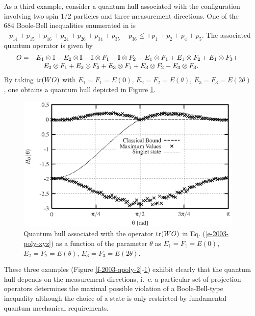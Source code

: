As a third example, consider a quantum hull associated with the
configuration involving two spin 1/2 particles and
three measurement directions. One of the 684 Boole-Bell inequalities enumerated in
\cite{2000-poly} is
$  - p_{14} + p_{15} + p_{16} +
  p_{24} + p_{26} + p_{34} + p_{35} - p_{36} \leq +p_{1}+ p_{2} + p_{4} + p_{5}$.
The associated quantum operator is given by
\begin{equation}
\begin{array}{l}
  O=- {E}_1 \otimes {\Bbb I} - {E}_2 \otimes {\Bbb I} - {\Bbb I} \otimes {F}_1 - {\Bbb I} \otimes
  {F}_2 -
  {E}_1 \otimes {F}_1 + {E}_1 \otimes {F}_2 + {E}_1 \otimes {F}_3 +\\
\qquad \qquad {E}_2
  \otimes {F}_1 + {E}_2 \otimes {F}_3 +
  {E}_3 \otimes {F}_1 + {E}_3 \otimes {F}_2 - {E}_3 \otimes {F}_3.
\end{array}
  \label{e-2003-poly-xyz}
\end{equation}
By taking ${\rm tr}(WO)$ with
${E}_1={F}_1=E(0)$,
${E}_2={F}_2=E(\theta)$,
${E}_3={F}_3=E(2\theta)$, one obtains a quantum hull depicted in Figure  \ref{f-2003-plotpit}.
\begin{figure}
  \centering
  \includegraphics{2003-qpoly-plotpit}
  \caption{Quantum hull associated with the operator
${\rm tr}(WO)$ in Eq. (\ref{e-2003-poly-xyz}) as a function of the parameter
$\theta$ as ${E}_1={F}_1=E(0)$,
${E}_2={F}_2=E(\theta)$,
${E}_3={F}_3=E(2\theta)$.}
  \label{f-2003-plotpit}
\end{figure}

These three examples (Figure \ref{f-2003-qpoly-2}-\ref{f-2003-plotpit}) exhibit clearly that the quantum hull depends on
the measurement directions, i.~e. a particular set of
projection operators determines the maximal possible violation of a
Boole-Bell-type inequality although the choice of a state is only
restricted by fundamental quantum mechanical requirements.


